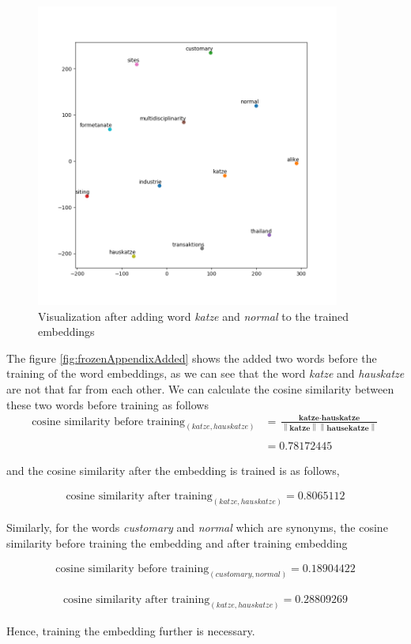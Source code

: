 \begin{figure}[!ht]
    \centering
    \includegraphics[width=10cm,height=10cm,keepaspectratio]{pics/after_selected_added_embedding.png}
    \captionsetup{justification=centering,margin=1cm}
    \caption{Visualization after adding word \textit{katze} and \textit{normal} to the trained embeddings}
    \label{fig:trainedAppendixAdded}
\end{figure}

\clearpage
The figure \ref{fig:frozenAppendixAdded} shows the added two words before the training of the word embeddings, as we can see that the word \textit{katze} and \textit{hauskatze} are not that far from each other. We can calculate the cosine similarity between these two words before training as follows 
\begin{align}
    \text{cosine similarity before training}_{(katze, hauskatze)} &= \frac{\textbf{katze} \cdot \textbf{hauskatze}}{\left \| \textbf{katze}\right \| \left \| \textbf{hausekatze} \right \|}\\\\
    &= 0.78172445
\end{align}

and the cosine similarity after the embedding is trained is as follows,

\begin{align}
    \text{cosine similarity after training}_{(katze, hauskatze)} = 0.8065112
\end{align}

Similarly, for the words \textit{customary} and \textit{normal} which are synonyms, the cosine similarity before training the embedding and after training embedding 

\begin{align}
    \text{cosine similarity before training}_{(customary, normal)} = 0.18904422
\end{align}

\begin{align}
    \text{cosine similarity after training}_{(katze, hauskatze)} = 0.28809269
\end{align}



Hence, training the embedding further is necessary.